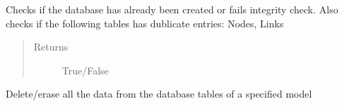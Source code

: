 \documentclass[letterpaper,10pt,english]{sphinxmanual}
\begin{document}
\begin{fulllineitems}
\begin{fulllineitems}
\begin{quote}
\begin{description}
\end{description}\end{quote}

\end{fulllineitems}


\begin{fulllineitems}
\label{\detokenize{api:beamon.database.database.Database.check_database}}
Checks if the database has already been created or fails integrity check. Also checks if the following tables
has dublicate entries: Nodes, Links
\begin{quote}\begin{description}
\item[{Returns}] \leavevmode
True/False

\end{description}\end{quote}

\end{fulllineitems}


\begin{fulllineitems}
\label{\detokenize{api:beamon.database.database.Database.clear_database}}
Delete/erase all the data from the database tables of a specified model

\end{fulllineitems}



\end{fulllineitems}
\end{document}
